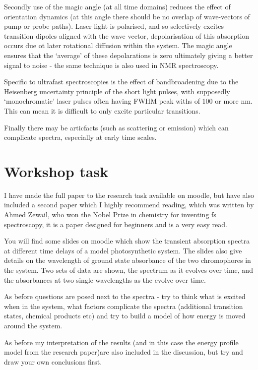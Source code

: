 \documentclass[
]{book}
\begin{document}
Secondly use of the magic angle (at all time domains) reduces the effect of orientation dynamics (at this angle there should be no overlap of wave-vectors of pump or probe paths). Laser light is polarised, and so selectively excites transition dipoles aligned with the wave vector, depolarisation of this absorption occurs due ot later rotational diffusion within the system. The magic angle ensures that the `average' of these depolarations is zero ultimately giving a better signal to noise - the same technique is also used in NMR spectroscopy.

Specific to ultrafast spectroscopies is the effect of bandbroadening due to the Heisenberg uncertainty principle of the short light pulses, with supposedly `monochromatic' laser pulses often having FWHM peak withs of 100 or more nm. This can mean it is difficult to only excite particular transitions.

Finally there may be articfacts (such as scattering or emission) which can complicate spectra, especially at early time scales.

\hypertarget{workshop-task}{%
\section{Workshop task}\label{workshop-task}}

I have made the full paper to the research task available on moodle, but have also included a second paper which I highly recommend reading, which was written by Ahmed Zewail, who won the Nobel Prize in chemistry for inventing fs spectroscopy, it is a paper designed for beginners and is a very easy read.

You will find some slides on moodle which show the transient absorption spectra at different time delays of a model photosynthetic system. The slides also give details on the wavelength of ground state absorbance of the two chromophores in the system. Two sets of data are shown, the spectrum as it evolves over time, and the absorbances at two single wavelengths as the evolve over time.

As before questions are posed next to the spectra - try to think what is excited when in the system, what factors complicate the spectra (additional transition states, chemical products etc) and try to build a model of how energy is moved around the system.

As before my interpretation of the results (and in this case the energy profile model from the research paper)are also included in the discussion, but try and draw your own conclusions first.
\end{document}
